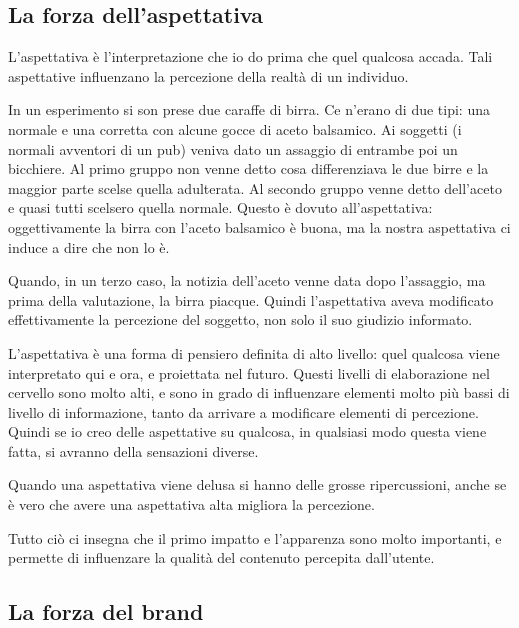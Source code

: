 \subsection{La forza dell'aspettativa}

L'aspettativa è l'interpretazione che io do prima che quel qualcosa accada.
Tali aspettative influenzano la percezione della realtà di un individuo.

In un esperimento si son prese due caraffe di birra. Ce n'erano di due tipi:
una normale e una corretta con alcune gocce di aceto balsamico. Ai soggetti (i
normali avventori di un pub) veniva dato un assaggio di entrambe poi un
bicchiere.
Al primo gruppo non venne detto cosa differenziava le due birre e la maggior
parte scelse quella adulterata. Al secondo gruppo venne detto dell'aceto e
quasi tutti scelsero quella normale.
Questo è dovuto all'aspettativa: oggettivamente la birra con l'aceto balsamico
è buona, ma la nostra aspettativa ci induce a dire che non lo è.

Quando, in un terzo caso, la notizia dell'aceto venne data dopo l'assaggio, ma
prima della valutazione, la birra piacque.
Quindi l'aspettativa aveva modificato effettivamente la percezione del
soggetto, non solo il suo giudizio informato.

L'aspettativa è una forma di pensiero definita di alto livello: quel qualcosa
viene interpretato qui e ora, e proiettata nel futuro. Questi livelli di
elaborazione nel cervello sono molto alti, e sono in grado di influenzare
elementi molto più bassi di livello di informazione, tanto da arrivare a
modificare elementi di percezione. Quindi se io creo delle aspettative su
qualcosa, in qualsiasi modo questa viene fatta, si avranno della sensazioni
diverse.

Quando una aspettativa viene delusa si hanno delle grosse ripercussioni, anche
se è vero che avere una aspettativa alta migliora la
percezione.



Tutto ciò ci insegna che il primo impatto e l'apparenza sono molto importanti,
e permette di influenzare la qualità del contenuto percepita dall'utente.

\subsection{La forza del brand}

